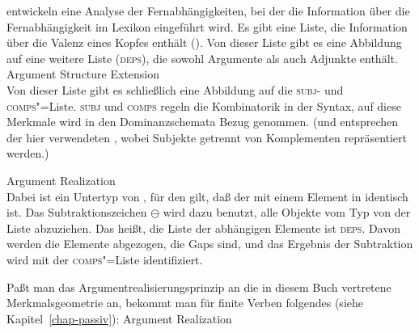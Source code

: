 \mbox{}\citet*{BMS2001a} entwickeln eine Analyse der Fernabhängigkeiten, bei der
die Information über die Fernabhängigkeit im Lexikon eingeführt wird. Es gibt
eine Liste, die Information über die Valenz eines Kopfes enthält (\argst).
Von dieser Liste gibt es eine Abbildung auf eine weitere Liste (\textsc{deps}),
die sowohl Argumente als auch Adjunkte enthält. 
\ea
Argument Structure Extension \citep*[]{BMS2001a}\\
 \impl {}
\z
Von dieser Liste gibt es schließlich eine Abbildung auf die \textsc{subj}- und \textsc{comps}"=Liste.
\textsc{subj} und \textsc{comps} regeln die Kombinatorik in der Syntax, auf diese Merkmale
wird in den Dominanzschemata Bezug genommen. (\subj und \comps entsprechen der hier verwendeten
\subcatl, wobei Subjekte getrennt von Komplementen repräsentiert werden.)

\eas
Argument Realization \citep*[]{BMS2001a}\\
 \impl {} 
\zs
Dabei ist  ein Untertyp von , für den gilt, daß der \localw mit einem
Element in \slasch identisch ist. Das Subtraktionszeichen $\ominus$\is{$\ominus$}\isrel{$\ominus$} wird dazu benutzt, alle Objekte
vom Typ  von der Liste  abzuziehen. Das heißt, die Liste der abhängigen
Elemente ist \textsc{deps}. Davon werden die Elemente abgezogen, die Gaps sind, und das Ergebnis der Subtraktion wird mit der
\textsc{comps}"=Liste identifiziert.

Paßt man das
Argumentrealisierungsprinzip an die in diesem Buch vertretene Merkmalsgeometrie an,
bekommt man für finite Verben folgendes (siehe Kapitel~\ref{chap-passiv}):
\ea
Argument Realization\\
 \impl {} 
\z



